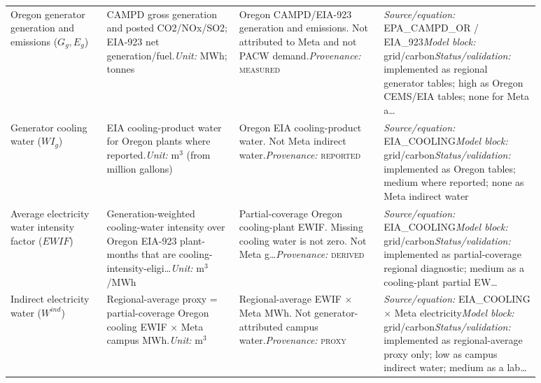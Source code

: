 \documentclass[11pt]{article}
\newcommand{\Reported}{\textsc{reported}}
\newcommand{\Measured}{\textsc{measured}}
\newcommand{\Derived}{\textsc{derived}}
\newcommand{\Proxy}{\textsc{proxy}}
\begin{document}
\begin{longtable}{@{}p{0.16\linewidth}p{0.22\linewidth}p{0.24\linewidth}p{0.26\linewidth}@{}}
Oregon generator generation and emissions ($G_g, E_g$) & CAMPD gross generation and posted CO2/NOx/SO2; EIA-923 net generation/fuel.\newline \textit{Unit:} MWh; tonnes & Oregon CAMPD/EIA-923 generation and emissions. Not attributed to Meta and not PACW demand.\newline \textit{Provenance:} \Measured{} & \textit{Source/equation:} EPA\_CAMPD\_OR / EIA\_923\newline \textit{Model block:} grid/carbon\newline \textit{Status/validation:} implemented as regional generator tables; high as Oregon CEMS/EIA tables; none for Meta a\ldots\\
Generator cooling water ($WI_g$) & EIA cooling-product water for Oregon plants where reported.\newline \textit{Unit:} m$^{3}$ (from million gallons) & Oregon EIA cooling-product water. Not Meta indirect water.\newline \textit{Provenance:} \Reported{} & \textit{Source/equation:} EIA\_COOLING\newline \textit{Model block:} grid/carbon\newline \textit{Status/validation:} implemented as Oregon tables; medium where reported; none as Meta indirect water\\
Average electricity water intensity factor ($EWIF$) & Generation-weighted cooling-water intensity over Oregon EIA-923 plant-months that are cooling-intensity-eligi\ldots\newline \textit{Unit:} m$^{3}$/MWh & Partial-coverage Oregon cooling-plant EWIF. Missing cooling water is not zero. Not Meta g\ldots\newline \textit{Provenance:} \Derived{} & \textit{Source/equation:} EIA\_COOLING\newline \textit{Model block:} grid/carbon\newline \textit{Status/validation:} implemented as partial-coverage regional diagnostic; medium as a cooling-plant partial EW\ldots\\
Indirect electricity water ($W^{ind}$) & Regional-average proxy = partial-coverage Oregon cooling EWIF $\times$ Meta campus MWh.\newline \textit{Unit:} m$^{3}$ & Regional-average EWIF $\times$ Meta MWh. Not generator-attributed campus water.\newline \textit{Provenance:} \Proxy{} & \textit{Source/equation:} EIA\_COOLING $\times$ Meta electricity\newline \textit{Model block:} grid/carbon\newline \textit{Status/validation:} implemented as regional-average proxy only; low as campus indirect water; medium as a lab\ldots\\

\end{longtable}
\end{document}
